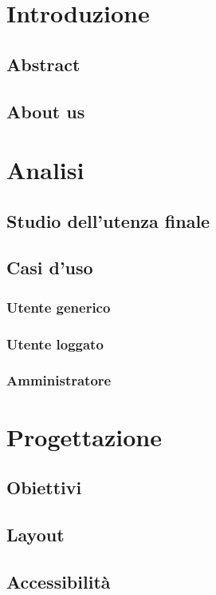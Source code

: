 \documentclass[a4paper, oneside, openany, dvipsnames, table]{article}
\begin{document}
\copertina
\tableofcontents
\newpage
\section{Introduzione}
	\subsection{Abstract}
	\subsection{About us}
	
\newpage
\section{Analisi}
	\subsection{Studio dell'utenza finale}
	
	\subsection{Casi d'uso}
		\subsubsection{Utente generico}
		\subsubsection{Utente loggato}
		\subsubsection{Amministratore}

\newpage
\section{Progettazione}
	\subsection{Obiettivi}
	\subsection{Layout}
	\subsection{Accessibilità}
\end{document}
